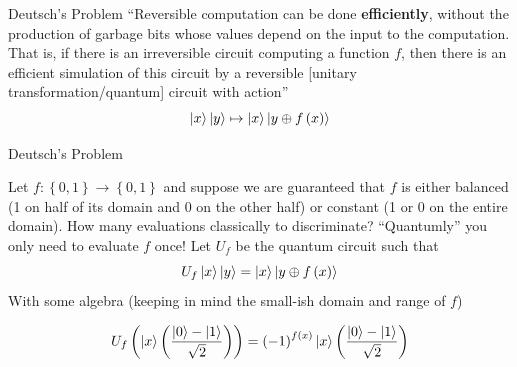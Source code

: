 \documentclass{beamer}
\begin{document}



\begin{frame}{Deutsch's Problem}
``Reversible computation can be done \textbf{efficiently}, without the production of garbage bits whose values depend on the input to the computation. That is, if there is an irreversible circuit computing a function $f$, then there is an efficient simulation of this circuit by a reversible [unitary transformation/quantum] circuit with action''\cite{Nielsen:2011:QCQ:1972505}
\[
\Ket{x}\Ket{y}\mapsto\Ket{x}\Ket{y\oplus f\left(x\right)}
\]

\end{frame}


\begin{frame}{Deutsch's Problem}

Let $f:\left\{ 0,1\right\} \to\left\{ 0,1\right\}$ and suppose we are guaranteed that $f$ is either balanced (1 on half of its domain and 0 on the other half)
or constant (1 or 0 on the entire domain). How many evaluations classically to discriminate? ``Quantumly'' you only need
to evaluate $f$ once! Let $U_f$ be the quantum circuit such that 
\[
U_f\Ket{x}\Ket{y}=\Ket{x}\Ket{y\oplus f\left(x\right)}
\]
With some algebra (keeping in mind the small-ish domain and range of $f$)

\[
U_{f}\left(\Ket{x}\left(\frac{\Ket{0}-\Ket{1}}{\sqrt{2}}\right)\right)=\left(-1\right)^{f\left(x\right)}\Ket{x}\left(\frac{\Ket{0}-\Ket{1}}{\sqrt{2}}\right)
\]
\end{frame}
\end{document}
